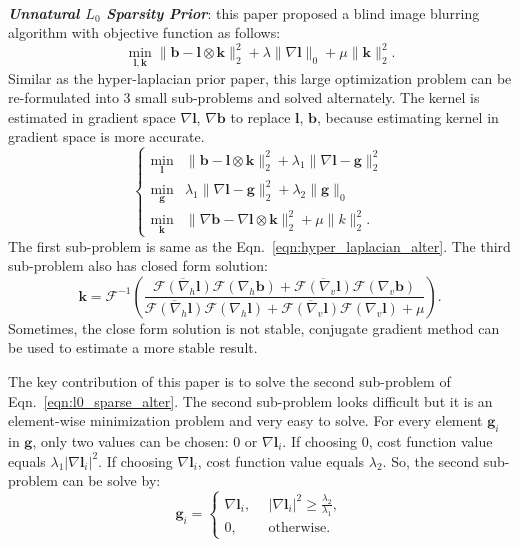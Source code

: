 \documentclass[journal, onecolumn, 10pt]{IEEEtran}
\begin{document}
~\\
\textbf{\emph{Unnatural $L_0$ Sparsity Prior}}\cite{xu2013unnatural}: this paper proposed a blind image blurring algorithm with objective function as follows:
\begin{equation}
\min_{\mathbf{l}, \mathbf{k}} \| \mathbf{b} - \mathbf{l} \otimes \mathbf{k} \|_2^2 + \lambda \|\nabla \mathbf{l} \|_0 + \mu \| \mathbf{k} \|_2^2.
\label{eqn:l0_sparse}
\end{equation}
Similar as the hyper-laplacian prior paper, this large optimization problem can be re-formulated into 3 small sub-problems and solved alternately. The kernel is estimated in gradient space $\nabla\mathbf{l}$, $\nabla\mathbf{b}$ to replace $\mathbf{l}$, $\mathbf{b}$, because estimating kernel in gradient space is more accurate\cite{cho2009fast}.
\begin{equation}
\begin{cases}
\min_{\mathbf{l}} &\| \mathbf{b} - \mathbf{l} \otimes \mathbf{k} \|_2^2 + \lambda_1 \|\nabla \mathbf{l} - \mathbf{g}\|_2^2 \\
\min_{\mathbf{g}} &\lambda_1\|\nabla \mathbf{l} - \mathbf{g}\|_2^2 + \lambda_2\|\mathbf{g}\|_{0} \\
\min_{\mathbf{k}} &\| \nabla\mathbf{b} - \nabla\mathbf{l} \otimes \mathbf{k} \|_2^2 + \mu \|k\|_2^2.
\end{cases}
\label{eqn:l0_sparse_alter}
\end{equation}
The first sub-problem is same as the Eqn.~\ref{eqn:hyper_laplacian_alter}. The third sub-problem also has closed form solution:
\begin{equation}
\mathbf{k} = \mathcal{F}^{-1} \left( \frac{\overline{\mathcal{F}(\nabla_h\mathbf{l})}\mathcal{F}(\nabla_h\mathbf{b}) + 
\overline{\mathcal{F}(\nabla_v\mathbf{l})}\mathcal{F}(\nabla_v\mathbf{b})}
{\overline{\mathcal{F}(\nabla_h\mathbf{l})}\mathcal{F}(\nabla_h\mathbf{l}) + 
\overline{\mathcal{F}(\nabla_v\mathbf{l})}\mathcal{F}(\nabla_v\mathbf{l}) + \mu} \right).
\label{eqn:l2_kernel_close_form}
\end{equation}
Sometimes, the close form solution is not stable, conjugate gradient method can be used to estimate a more stable result.

The key contribution of this paper is to solve the second sub-problem of Eqn.~\ref{eqn:l0_sparse_alter}. 
The second sub-problem looks difficult but it is an element-wise minimization problem and very easy to solve. For every element $\mathbf{g}_i$ in $\mathbf{g}$, only two values can be chosen: $0$ or $\nabla \mathbf{l}_i$. If choosing $0$, cost function value equals $\lambda_1 |\nabla \mathbf{l}_i|^2$. If choosing $\nabla \mathbf{l}_i$, cost function value equals $\lambda_2$. So, the second sub-problem can be solve by:
\begin{equation}
\mathbf{g}_i = 
\begin{cases}
\nabla\mathbf{l}_i, &~~ |\nabla\mathbf{l}_i|^2 \geqslant \frac{\lambda_2}{\lambda_1}, \\
0, &~~ \text{otherwise}.
\end{cases}
\end{equation}
\end{document}
